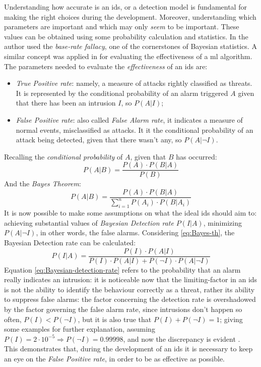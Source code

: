 Understanding how accurate is an \gls{ids}, or a detection model is fundamental for making the right choices during the development. Moreover, understanding which parameters are important and which may only \textit{seem} to be important. These values can be obtained using some probability calculation and statistics. In \cite{Axelsson2000} the author used the \textit{base-rate fallacy}, one of the cornerstones of Bayesian statistics. A similar concept was applied in \cite{Liu2019} for evaluating the effectiveness of a \gls{ml} algorithm. The parameters needed to evaluate the \textit{effectiveness} of an \gls{ids} are:
\begin{itemize}
    \item[\faCaretRight] \textit{True Positive rate}: namely, a measure of attacks rightly classified as threats. It is represented by the conditional probability of an alarm triggered $A$ given that there has been an intrusion $I$, so $P(A|I)$;
    \item[\faCaretRight] \textit{False Positive rate}: also called \textit{False Alarm rate}, it indicates a measure of normal events, misclassified as attacks. It it the conditional probability of an attack being detected, given that there wasn't any, so $P(A|\neg I)$.
\end{itemize}
Recalling the \textit{conditional probability} of $A$, given that $B$ has occurred:
\begin{equation}
    P(A|B)=\frac{P(A)\cdot P(B|A)}{P(B)}
    \label{eq:conditional-prob}
\end{equation}
And the \textit{Bayes Theorem}:
\begin{equation}
    P(A|B)=\frac{P(A)\cdot P(B|A)}{\sum_{i=1}^nP(A_i)\cdot P(B|A_i)}
    \label{eq:Bayes-th}
\end{equation}
It is now possible to make some assumptions on what the ideal \gls{ids} should aim to: achieving substantial values of \textit{Bayesian Detection rate} $P(I|A)$, minimizing $P(A|\neg I)$, in other words, the false alarms. Considering \ref{eq:Bayes-th}, the Bayesian Detection rate can be calculated:
\begin{equation}
    P(I|A)=\frac{P(I)\cdot P(A|I)}{P(I)\cdot P(A|I)+ P(\neg I)\cdot P(A|\neg I)}
    \label{eq:Bayesian-detection-rate}
\end{equation}
Equation \ref{eq:Bayesian-detection-rate} refers to the probability that an alarm really indicates an intrusion: it is noticeable now that the limiting-factor in an \gls{ids} is not the ability to identify the behaviour correctly as a threat, rather its ability to suppress false alarms: the factor concerning the detection rate is overshadowed by the factor governing the false alarm rate, since intrusions don't happen so often, $P(I)<P(\neg I)$, but it is also true that $P(I)+P(\neg I)=1$; giving some examples for further explanation, assuming $P(I)=2\cdot 10^{-5}\Rightarrow P(\neg I)=0.99998$, and now the discrepancy is evident \cite{Axelsson2000}. \\ This demonstrates that, during the development of an \gls{ids} it is necessary to keep an eye on the \textit{False Positive rate}, in order to be as effective as possible.

